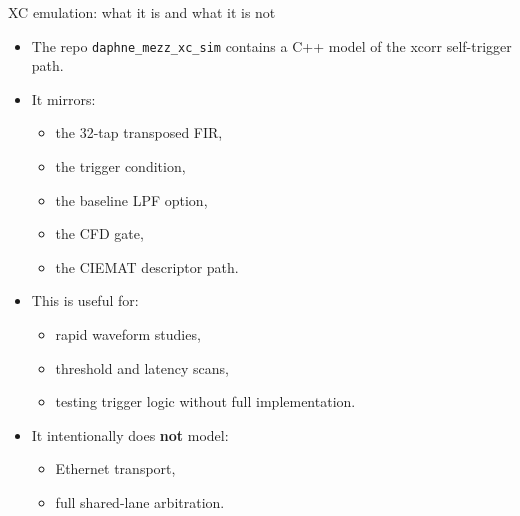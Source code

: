 \documentclass[aspectratio=169]{beamer}
\begin{document}
\begin{frame}{XC emulation: what it is and what it is not}
\small
\begin{itemize}
  \item The repo \texttt{daphne\_mezz\_xc\_sim} contains a C++ model of the xcorr self-trigger path.
  \item It mirrors:
  \begin{itemize}
    \item the 32-tap transposed FIR,
    \item the trigger condition,
    \item the baseline LPF option,
    \item the CFD gate,
    \item the CIEMAT descriptor path.
  \end{itemize}
  \item This is useful for:
  \begin{itemize}
    \item rapid waveform studies,
    \item threshold and latency scans,
    \item testing trigger logic without full implementation.
  \end{itemize}
  \item It intentionally does \textbf{not} model:
  \begin{itemize}
    \item Ethernet transport,
    \item full shared-lane arbitration.
  \end{itemize}
\end{itemize}
\end{frame}
\end{document}
